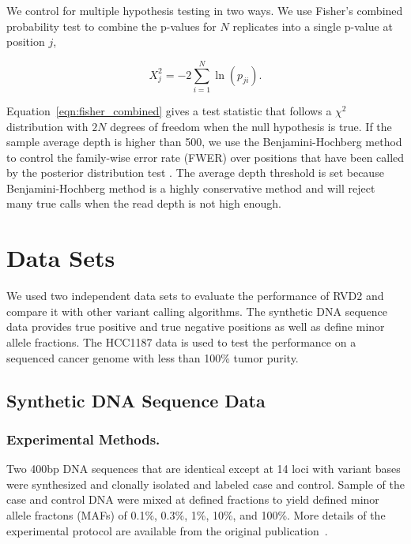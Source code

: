 \documentclass{bioinfo}
\begin{document}
We control for multiple hypothesis testing in two ways. We use Fisher's combined probability test \citep{fisher1970statistical} to combine the p-values for $N$ replicates into a single p-value at position $j$,

\begin{equation}\label{eqn:fisher_combined}
	X_j^2 = -2 \sum_{i=1}^N \ln(p_{ji}).
\end{equation}

Equation~\eqref{eqn:fisher_combined} gives a test statistic that follows a $\chi^2$ distribution with $2N$ degrees of freedom when the null hypothesis is true. If the sample average depth is higher than 500, we use the Benjamini-Hochberg method to control the family-wise error rate (FWER) over positions that have been called by the posterior distribution test \citep{benjamini1995controlling, efron2010large}. The average depth threshold is set because Benjamini-Hochberg method is a highly conservative method and will reject many true calls when the read depth is not high enough.

\section{Data Sets}

We used two independent data sets to evaluate the performance of RVD2 and compare it with other variant calling algorithms. The synthetic DNA sequence data provides true positive and true negative positions as well as define minor allele fractions. The HCC1187 data is used to test the performance on a sequenced cancer genome with less than 100\% tumor purity.

\subsection{Synthetic DNA Sequence Data}

\subsubsection*{Experimental Methods.}
Two 400bp DNA sequences that are identical except at 14 loci with variant bases were synthesized and clonally isolated and labeled case and control. Sample of the case and control DNA were mixed at defined fractions to yield defined minor allele fractons (MAFs) of 0.1\%, 0.3\%, 1\%, 10\%, and 100\%. More details of the experimental protocol are available from the original publication~\citep{Flaherty:2011ja}.
\end{document}
